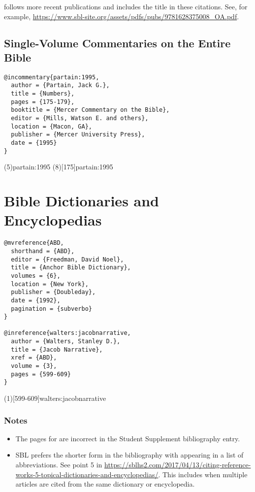 \documentclass[a4paper]{article}
\begin{document}
 follows more recent publications and includes the title in
these citations. See, for example,
\url{https://www.sbl-site.org/assets/pdfs/pubs/9781628375008_OA.pdf}.

\subsection{Single-Volume Commentaries on the Entire Bible}

\begin{verbatim}
@incommentary{partain:1995,
  author = {Partain, Jack G.},
  title = {Numbers},
  pages = {175-179},
  booktitle = {Mercer Commentary on the Bible},
  editor = {Mills, Watson E. and others},
  location = {Macon, GA},
  publisher = {Mercer University Press},
  date = {1995}
}
\end{verbatim}

\examplecite(5){partain:1995}
\examplecite(8)[175]{partain:1995}
\examplebibliography

\section{Bible Dictionaries and Encyclopedias}

\begin{verbatim}
@mvreference{ABD,
  shorthand = {ABD},
  editor = {Freedman, David Noel},
  title = {Anchor Bible Dictionary},
  volumes = {6},
  location = {New York},
  publisher = {Doubleday},
  date = {1992},
  pagination = {subverbo}
}

@inreference{walters:jacobnarrative,
  author = {Walters, Stanley D.},
  title = {Jacob Narrative},
  xref = {ABD},
  volume = {3},
  pages = {599-609}
}
\end{verbatim}

\examplecite(1)[599-609]{walters:jacobnarrative}
\exampleabbreviations
\examplebibliography

\subsubsection{Notes}

\begin{itemize}
  \item The pages for \cite{walters:jacobnarrative} are incorrect in the
    Student Supplement bibliography entry.
  \item SBL prefers the shorter form in the bibliography with \cite{ABD}
    appearing in a list of abbreviations. See point 5 in
    \url{https://sblhs2.com/2017/04/13/citing-reference-works-5-topical-dictionaries-and-encyclopedias/}.
    This includes when multiple articles are cited from the same dictionary or
    encyclopedia.
\end{itemize}
\end{document}
